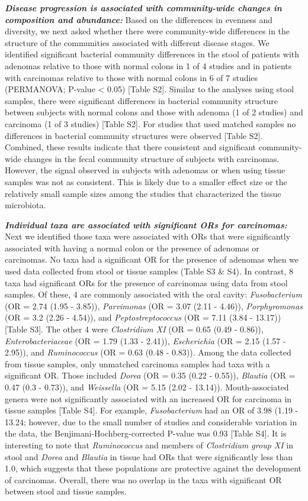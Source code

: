 \documentclass[12pt,]{article}
\begin{document}
\textbf{\emph{Disease progression is associated with community-wide
changes in composition and abundance:}} Based on the differences in
evenness and diversity, we next asked whether there were community-wide
differences in the structure of the communities associated with
different disease stages. We identified significant bacterial community
differences in the stool of patients with adenomas relative to those
with normal colons in 1 of 4 studies and in patients with carcinomas
relative to those with normal colons in 6 of 7 studies (PERMANOVA;
P-value \textless{} 0.05) {[}Table S2{]}. Similar to the analyses using
stool samples, there were significant differences in bacterial community
structure between subjects with normal colons and those with adenoma (1
of 2 studies) and carcinoma (1 of 3 studies) {[}Table S2{]}. For studies
that used matched samples no differences in bacterial community
structures were observed {[}Table S2{]}. Combined, these results
indicate that there consistent and significant community-wide changes in
the fecal community structure of subjects with carcinomas. However, the
signal observed in subjects with adenomas or when using tissue samples
was not as consistent. This is likely due to a smaller effect size or
the relatively small sample sizes among the studies that characterized
the tissue microbiota.

\textbf{\emph{Individual taxa are associated with significant ORs for
carcinomas:}} Next we identified those taxa were associated with ORs
that were significantly associated with having a normal colon or the
presence of adenomas or carcinomas. No taxa had a significant OR for the
presence of adenomas when we used data collected from stool or tissue
samples (Table S3 \& S4). In contrast, 8 taxa had significant ORs for
the presence of carcinomas using data from stool samples. Of these, 4
are commonly associated with the oral cavity: \emph{Fusobacterium} (OR =
2.74 (1.95 - 3.85)), \emph{Parvimonas} (OR = 3.07 (2.11 - 4.46)),
\emph{Porphyromonas} (OR = 3.2 (2.26 - 4.54)), and
\emph{Peptostreptococcus} (OR = 7.11 (3.84 - 13.17)) {[}Table S3{]}. The
other 4 were \emph{Clostridium XI} (OR = 0.65 (0.49 - 0.86)),
\emph{Enterobacteriaceae} (OR = 1.79 (1.33 - 2.41)), \emph{Escherichia}
(OR = 2.15 (1.57 - 2.95)), and \emph{Ruminococcus} (OR = 0.63 (0.48 -
0.83)). Among the data collected from tissue samples, only unmatched
carcinoma samples had taxa with a significant OR. Those included
\emph{Dorea} (OR = 0.35 (0.22 - 0.55)), \emph{Blautia} (OR = 0.47 (0.3 -
0.73)), and \emph{Weissella} (OR = 5.15 (2.02 - 13.14)).
Mouth-associated genera were not significantly associated with an
increased OR for carcinoma in tissue samples {[}Table S4{]}. For
example, \emph{Fusobacterium} had an OR of 3.98 (1.19 - 13.24; however,
due to the small number of studies and considerable variation in the
data, the Benjimani-Hochberg-corrected P-value was 0.93 {[}Table S4{]}.
It is interesting to note that \emph{Ruminococcus} and members of
\emph{Clostridium group XI} in stool and \emph{Dorea} and \emph{Blautia}
in tissue had ORs that were significantly less than 1.0, which suggests
that these populations are protective against the development of
carcinomas. Overall, there was no overlap in the taxa with significant
OR between stool and tissue samples.
\end{document}
